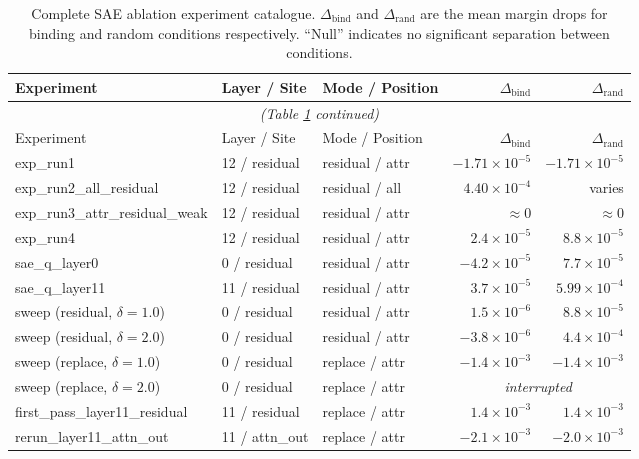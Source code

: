 \documentclass[11pt,a4paper]{article}
\begin{document}
\begin{longtable}{p{5.5cm}p{2.2cm}p{2.2cm}rr}
\caption{Complete SAE ablation experiment catalogue. $\Delta_{\mathrm{bind}}$ and
  $\Delta_{\mathrm{rand}}$ are the mean margin drops for binding and random conditions respectively.
  ``Null'' indicates no significant separation between conditions.}
\label{tab:sae_catalogue}\\
\toprule
Experiment & Layer / Site & Mode / Position & $\Delta_{\mathrm{bind}}$ & $\Delta_{\mathrm{rand}}$ \\
\midrule
\endfirsthead
\multicolumn{5}{c}{\small\textit{(Table \ref{tab:sae_catalogue} continued)}}\\
\toprule
Experiment & Layer / Site & Mode / Position & $\Delta_{\mathrm{bind}}$ & $\Delta_{\mathrm{rand}}$ \\
\midrule
\endhead
\bottomrule
\endfoot
exp\_run1 & 12 / residual & residual / attr & $-1.71 \times 10^{-5}$ & $-1.71 \times 10^{-5}$ \\
exp\_run2\_all\_residual & 12 / residual & residual / all & $4.40 \times 10^{-4}$ & varies \\
exp\_run3\_attr\_residual\_weak & 12 / residual & residual / attr & $\approx 0$ & $\approx 0$ \\
exp\_run4 & 12 / residual & residual / attr & $2.4 \times 10^{-5}$ & $8.8 \times 10^{-5}$ \\
sae\_q\_layer0 & 0 / residual & residual / attr & $-4.2 \times 10^{-5}$ & $7.7 \times 10^{-5}$ \\
sae\_q\_layer11 & 11 / residual & residual / attr & $3.7 \times 10^{-5}$ & $5.99 \times 10^{-4}$ \\
sweep (residual, $\delta{=}1.0$) & 0 / residual & residual / attr & $1.5 \times 10^{-6}$ & $8.8 \times 10^{-5}$ \\
sweep (residual, $\delta{=}2.0$) & 0 / residual & residual / attr & $-3.8 \times 10^{-6}$ & $4.4 \times 10^{-4}$ \\
sweep (replace, $\delta{=}1.0$) & 0 / residual & replace / attr & $-1.4 \times 10^{-3}$ & $-1.4 \times 10^{-3}$ \\
sweep (replace, $\delta{=}2.0$) & 0 / residual & replace / attr & \multicolumn{2}{c}{\textit{interrupted}} \\
first\_pass\_layer11\_residual & 11 / residual & replace / attr & $1.4 \times 10^{-3}$ & $1.4 \times 10^{-3}$ \\
rerun\_layer11\_attn\_out & 11 / attn\_out & replace / attr & $-2.1 \times 10^{-3}$ & $-2.0 \times 10^{-3}$ \\

\end{longtable}
\end{document}
